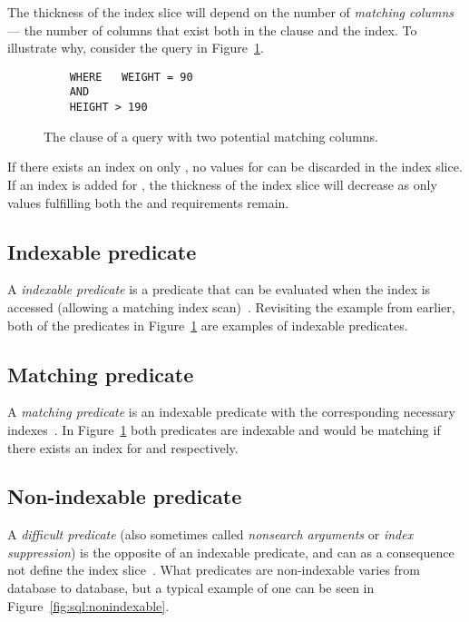 The thickness of the index slice will depend on the number of \textit{matching
  columns} --- the number of columns that exist both in the 
clause and the index. To illustrate why, consider the query in
Figure~\ref{fig:sql:indexslice}.

\begin{figure}[ht]
  \begin{verbatim}
    WHERE   WEIGHT = 90
    AND
    HEIGHT > 190
  \end{verbatim}
  \caption[The  clause of a query with two potential matching
  columns]{The  clause of a query with two potential matching
    columns.}\label{fig:sql:indexslice}
\end{figure}

If there exists an index on only , no values for  can be
discarded in the index slice. If an index is added for , the
thickness of the index slice will decrease as only values fulfilling both the
 and  requirements remain.

\subsection*{Indexable predicate}
A \textit{indexable predicate} is a predicate that can be evaluated when the
index is accessed (allowing a matching index scan)~\cite{2014_summary_sopp,
  2013_ibm_ikcianp}. Revisiting the example from earlier, both of the predicates
in Figure~\ref{fig:sql:indexslice} are examples of indexable predicates.

\subsection*{Matching predicate}
A \textit{matching predicate} is an indexable predicate with the corresponding
necessary indexes~\cite{2013_ibm_ikcianp}. In Figure~\ref{fig:sql:indexslice}
both predicates are indexable and would be matching if there exists an index for
 and  respectively.

\subsection*{Non-indexable predicate}
A \textit{difficult predicate} (also sometimes called \textit{nonsearch
  arguments} or \textit{index suppression}) is the
opposite of an indexable predicate, and can as a consequence not define the
index slice~\cite{lahdenmaki_2005_relational_rdidatodossea}. What predicates are
non-indexable varies from database to database, but a typical example of one can
be seen in Figure~\ref{fig:sql:nonindexable}.

